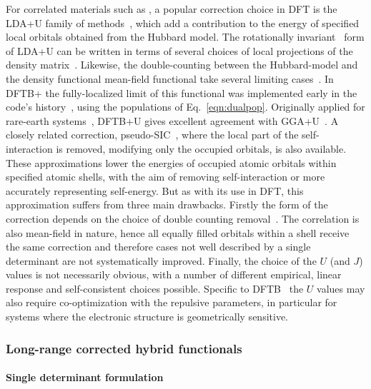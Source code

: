 \documentclass[reprint,onecolumn,superscriptaddress]{revtex4-1}
\newcommand{\dftbp}{DFTB+}
\begin{document}
For correlated materials such as , a popular correction choice in DFT is
the LDA+U family of methods~\cite{Anisimov_1997}, which add a contribution to the
energy of specified local orbitals obtained from the Hubbard model. The
rotationally invariant~\cite{PhysRevB.57.1505} form of LDA+U can be written in
terms of several choices of local projections of the density
matrix~\cite{PhysRevB.73.045110}. Likewise, the double-counting between the
Hubbard-model and the density functional mean-field functional take several
limiting cases~\cite{PhysRevB.67.153106}. In \dftbp{} the fully-localized limit
of this functional was implemented early in the code's
history~\cite{hourahine07}, using the populations of
Eq.~\eqref{eqn:dualpop}. Originally applied for rare-earth
systems~\cite{doi:10.1002/pssc.200778667}, DFTB+U gives excellent agreement with
GGA+U~\cite{doi:10.1063/1.5085190}. A closely related correction,
pseudo-SIC~\cite{PhysRevB.67.125109}, where the local part of the
self-interaction is removed, modifying only the occupied orbitals, is also
available.  These approximations lower the energies of occupied atomic orbitals
within specified atomic shells, with the aim of removing self-interaction or
more accurately representing self-energy. But as with its use in DFT, this
approximation suffers from three main drawbacks. Firstly the form of the
correction depends on the choice of double counting
removal~\cite{PhysRevB.79.035103}. The correlation is also mean-field in nature,
hence all equally filled orbitals within a shell receive the same correction and
therefore cases not well described by a single determinant are not
systematically improved. Finally, the choice of the $U$ (and $J$) values is not
necessarily obvious, with a number of different empirical, linear response and
self-consistent choices possible. Specific to
DFTB~\cite{doi:10.1021/acs.jpcc.6b10557} the $U$ values may also require
co-optimization with the repulsive parameters, in particular for systems where
the electronic structure is geometrically sensitive.

\subsubsection{Long-range corrected hybrid functionals}

\paragraph{Single determinant formulation}
\end{document}

